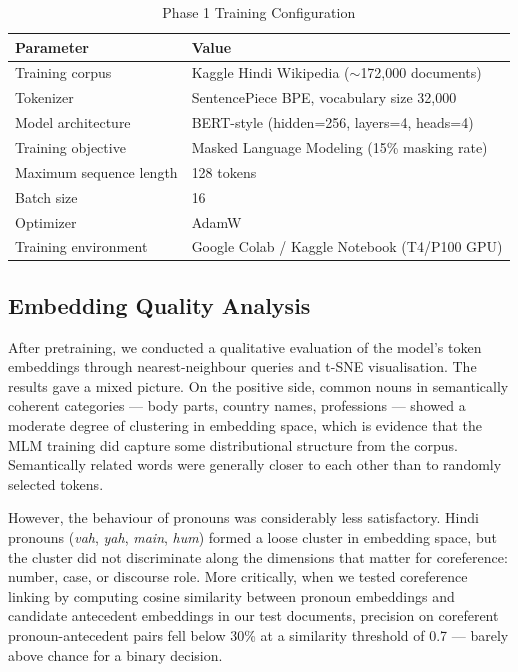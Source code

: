 \documentclass[12pt,a4paper]{report}
\begin{document}
\begin{table}[H]
\centering
\caption{Phase 1 Training Configuration}
\label{tab:p1_setup}
\begin{tabular}{|l|l|}
\hline
\textbf{Parameter} & \textbf{Value} \\
\hline
Training corpus & Kaggle Hindi Wikipedia ($\sim$172,000 documents) \\
Tokenizer & SentencePiece BPE, vocabulary size 32,000 \\
Model architecture & BERT-style (hidden=256, layers=4, heads=4) \\
Training objective & Masked Language Modeling (15\% masking rate) \\
Maximum sequence length & 128 tokens \\
Batch size & 16 \\
Optimizer & AdamW \\
Training environment & Google Colab / Kaggle Notebook (T4/P100 GPU) \\
\hline
\end{tabular}
\end{table}

\subsection{Embedding Quality Analysis}

After pretraining, we conducted a qualitative evaluation of the model's token embeddings through nearest-neighbour queries and t-SNE visualisation. The results gave a mixed picture. On the positive side, common nouns in semantically coherent categories --- body parts, country names, professions --- showed a moderate degree of clustering in embedding space, which is evidence that the MLM training did capture some distributional structure from the corpus. Semantically related words were generally closer to each other than to randomly selected tokens.

However, the behaviour of pronouns was considerably less satisfactory. Hindi pronouns (\textit{vah}, \textit{yah}, \textit{main}, \textit{hum}) formed a loose cluster in embedding space, but the cluster did not discriminate along the dimensions that matter for coreference: number, case, or discourse role. More critically, when we tested coreference linking by computing cosine similarity between pronoun embeddings and candidate antecedent embeddings in our test documents, precision on coreferent pronoun-antecedent pairs fell below 30\% at a similarity threshold of 0.7 --- barely above chance for a binary decision.
\end{document}
